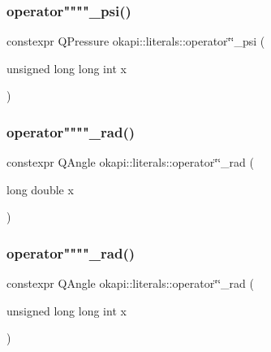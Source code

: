 \mbox{\label{namespaceokapi_1_1literals_a417c6915b7fda121bfd22db3bb721b18}} 
\subsubsection{\texorpdfstring{operator""""\_psi()}{operator""\_psi()}\hspace{0.1cm}{\footnotesize\ttfamily [2/2]}}
{\footnotesize\ttfamily constexpr Q\+Pressure okapi\+::literals\+::operator\char`\"{}\char`\"{}\+\_\+psi (\begin{DoxyParamCaption}\item[{unsigned long long int}]{x }\end{DoxyParamCaption})}

\mbox{\label{namespaceokapi_1_1literals_a07f1b869e43b86032c308adad74d32fe}} 
\subsubsection{\texorpdfstring{operator""""\_rad()}{operator""\_rad()}\hspace{0.1cm}{\footnotesize\ttfamily [1/2]}}
{\footnotesize\ttfamily constexpr Q\+Angle okapi\+::literals\+::operator\char`\"{}\char`\"{}\+\_\+rad (\begin{DoxyParamCaption}\item[{long double}]{x }\end{DoxyParamCaption})}

\mbox{\label{namespaceokapi_1_1literals_a81747a819272e667c22af7e4b6964de9}} 
\subsubsection{\texorpdfstring{operator""""\_rad()}{operator""\_rad()}\hspace{0.1cm}{\footnotesize\ttfamily [2/2]}}
{\footnotesize\ttfamily constexpr Q\+Angle okapi\+::literals\+::operator\char`\"{}\char`\"{}\+\_\+rad (\begin{DoxyParamCaption}\item[{unsigned long long int}]{x }\end{DoxyParamCaption})}

